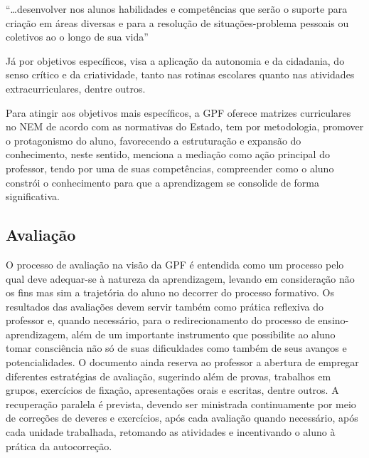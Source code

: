 \begin{citacao}
    ``\ldots desenvolver nos alunos habilidades e competências que serão o suporte para criação em áreas diversas e para a resolução de situações-problema pessoais ou coletivos ao o longo de sua vida'' \cite[p. ~32]{GPFPPP:2021}
\end{citacao}
Já por objetivos específicos, visa a aplicação da autonomia e da cidadania, do senso crítico e da criatividade, tanto nas rotinas escolares quanto nas atividades extracurriculares, dentre outros.

Para atingir aos objetivos mais específicos, a \ac{GPF} oferece matrizes curriculares no \ac{NEM} de acordo com as normativas do Estado, tem por metodologia, promover o protagonismo do aluno, favorecendo a estruturação e expansão do conhecimento, neste sentido, menciona a mediação como ação principal do professor, tendo por uma de suas competências, compreender como o aluno constrói o conhecimento para que a aprendizagem se consolide de forma significativa.

\subsection{Avaliação}
O processo de avaliação na visão da \ac{GPF} é entendida como um processo pelo qual deve adequar-se à natureza da aprendizagem, levando em consideração não os fins mas sim a trajetória do aluno no decorrer do processo formativo. Os resultados das avaliações devem servir também como prática reflexiva do professor e, quando necessário, para o redirecionamento do processo de ensino-aprendizagem, além de um importante instrumento que possibilite ao aluno tomar consciência não só de suas dificuldades como também de seus avanços e potencialidades. O documento ainda reserva ao professor a abertura de empregar diferentes estratégias de avaliação, sugerindo além de provas, trabalhos em grupos, exercícios de fixação, apresentações orais e escritas, dentre outros. A recuperação paralela é prevista, devendo ser ministrada continuamente por meio de correções de deveres e exercícios, após cada avaliação quando necessário, após cada unidade trabalhada, retomando as atividades e incentivando o aluno à prática da autocorreção.
